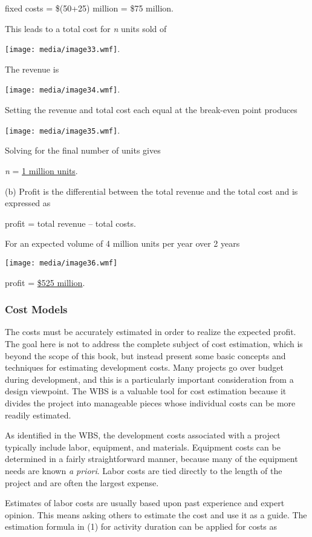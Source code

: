fixed costs = \$(50+25) million = \$75 million.

This leads to a total cost for \emph{n} units sold of

\texttt{[image: media/image33.wmf]}.

The revenue is

\texttt{[image: media/image34.wmf]}.

Setting the revenue and total cost each equal at the break-even point
produces

\texttt{[image: media/image35.wmf]}.

Solving for the final number of units gives

\emph{n} = \ul{1 million units}.

(b) Profit is the differential between the total revenue and the total
cost and is expressed as

profit = total revenue -- total costs.

For an expected volume of 4 million units per year over 2 years

\texttt{[image: media/image36.wmf]}

profit = \ul{\$525 million}.

\subsubsection{Cost Models}\label{cost-models}

The costs must be accurately estimated in order to realize the expected
profit. The goal here is not to address the complete subject of cost
estimation, which is beyond the scope of this book, but instead present
some basic concepts and techniques for estimating development costs.
Many projects go over budget during development, and this is a
particularly important consideration from a design viewpoint. The WBS is
a valuable tool for cost estimation because it divides the project into
manageable pieces whose individual costs can be more readily estimated.

As identified in the WBS, the development costs associated with a
project typically include labor, equipment, and materials. Equipment
costs can be determined in a fairly straightforward manner, because many
of the equipment needs are known \emph{a priori}. Labor costs are tied
directly to the length of the project and are often the largest expense.

Estimates of labor costs are usually based upon past experience and
expert opinion. This means asking others to estimate the cost and use it
as a guide. The estimation formula in (1) for activity duration can be
applied for costs as


